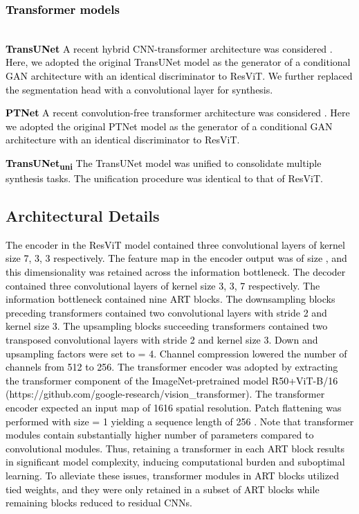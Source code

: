 \documentclass[journal,twoside,web]{ieeecolor}
\newcommand*{\revhl}{\textcolor{black}}
\begin{document}
\subsubsection{\revhl{Transformer models}}
~\\ \revhl{\textbf{\quad TransUNet} A recent hybrid CNN-transformer architecture was considered  \cite{trans_unet}. Here, we adopted the original TransUNet model as the generator of a conditional GAN architecture with an identical discriminator to ResViT. We further replaced the segmentation head with a convolutional layer for synthesis.}

\revhl{\textbf{PTNet} A recent convolution-free transformer architecture was considered \cite{ptnet}. Here we adopted the original PTNet model as the generator of a conditional GAN architecture with an identical discriminator to ResViT.}

\revhl{\textbf{TransUNet\textsubscript{uni}} The TransUNet model was unified to consolidate multiple synthesis tasks. The unification procedure was identical to that of ResViT.
}




\vspace{-2mm}
\subsection{Architectural Details}

\revhl{The encoder in the ResViT model contained three convolutional layers of kernel size 7, 3, 3 respectively. The feature map in the encoder output was of size , and this dimensionality was retained across the information bottleneck. The decoder contained three convolutional layers of kernel size 3, 3, 7 respectively. The information bottleneck contained nine ART blocks. The downsampling blocks preceding transformers contained two convolutional layers with stride 2 and kernel size 3. The upsampling blocks succeeding transformers contained two transposed convolutional layers with stride 2 and kernel size 3. Down and upsampling factors were set to  = 4. Channel compression lowered the number of channels from 512 to 256. The transformer encoder was adopted by extracting the transformer component of the ImageNet-pretrained model R50+ViT-B/16 (https://github.com/google-research/vision\_transformer). The transformer encoder expected an input map of 1616 spatial resolution. Patch flattening was performed with size  = 1 yielding a sequence length of 256 \cite{vit}. Note that transformer modules contain substantially higher number of parameters compared to convolutional modules. Thus, retaining a transformer in each ART block results in significant model complexity, inducing computational burden and suboptimal learning. To alleviate these issues, transformer modules in ART blocks utilized tied weights, and they were only retained in a subset of ART blocks while remaining blocks reduced to residual CNNs.} 
\end{document}
